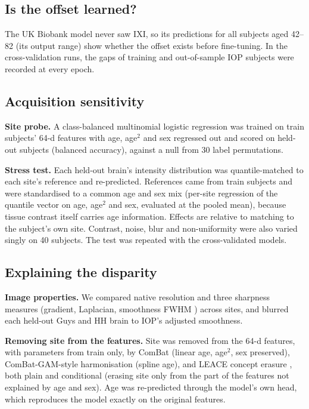 \documentclass[conference]{IEEEtran}
\begin{document}
\subsection{Is the offset learned?}
The UK Biobank model never saw IXI, so its predictions for all subjects aged 42--82 (its output range) show whether the offset exists before fine-tuning. In the cross-validation runs, the gaps of training and out-of-sample IOP subjects were recorded at every epoch.

\subsection{Acquisition sensitivity}
\textbf{Site probe.} A class-balanced multinomial logistic regression \cite{alain2016probes} was trained on train subjects' 64-d features with age, age$^2$ and sex regressed out and scored on held-out subjects (balanced accuracy), against a null from 30 label permutations.

\textbf{Stress test.} Each held-out brain's intensity distribution was quantile-matched \cite{nyul2000standardization} to each site's reference and re-predicted. References came from train subjects and were standardised to a common age and sex mix (per-site regression of the quantile vector on age, age$^2$ and sex, evaluated at the pooled mean), because tissue contrast itself carries age information. Effects are relative to matching to the subject's own site. Contrast, noise, blur and non-uniformity were also varied singly on 40 subjects. The test was repeated with the cross-validated models.

\subsection{Explaining the disparity}
\textbf{Image properties.} We compared native resolution and three sharpness measures (gradient, Laplacian, smoothness FWHM \cite{forman1995fwhm}) across sites, and blurred each held-out Guys and HH brain to IOP's adjusted smoothness.

\textbf{Removing site from the features.} Site was removed from the 64-d features, with parameters from train only, by ComBat \cite{johnson2007combat,fortin2018harmonization} (linear age, age$^2$, sex preserved), ComBat-GAM-style harmonisation \cite{pomponio2020combatgam} (spline age), and LEACE concept erasure \cite{belrose2023leace}, both plain and conditional (erasing site only from the part of the features not explained by age and sex). Age was re-predicted through the model's own head, which reproduces the model exactly on the original features.
\end{document}
